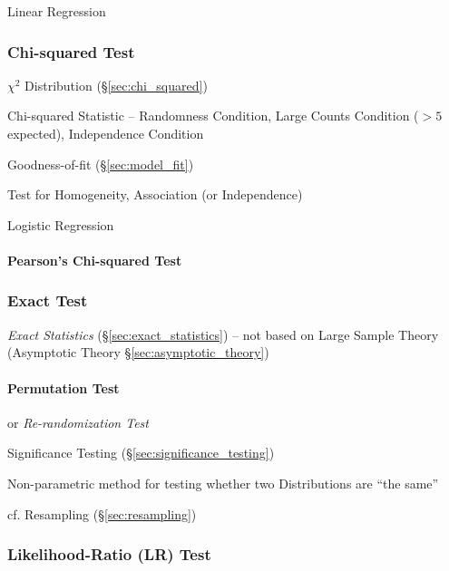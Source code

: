 Linear Regression



\subsubsection{Chi-squared Test}\label{sec:chi_squared_test}

$\chi^2$ Distribution (\S\ref{sec:chi_squared})

Chi-squared Statistic -- Randomness Condition, Large Counts Condition ($>5$
expected), Independence Condition

Goodness-of-fit (\S\ref{sec:model_fit})

Test for Homogeneity, Association (or Independence)

Logistic Regression



\paragraph{Pearson's Chi-squared Test}\label{sec:pearsons_chi_squared}\hfill



\subsubsection{Exact Test}\label{sec:exact_test}

\emph{Exact Statistics} (\S\ref{sec:exact_statistics}) -- not based on Large
Sample Theory (Asymptotic Theory \S\ref{sec:asymptotic_theory})



\paragraph{Permutation Test}\label{sec:permutation_test}\hfill

or \emph{Re-randomization Test}

Significance Testing (\S\ref{sec:significance_testing})

Non-parametric method for testing whether two Distributions are ``the same''

\fist cf. Resampling (\S\ref{sec:resampling})



\subsubsection{Likelihood-Ratio (LR) Test}\label{sec:lr_test}

